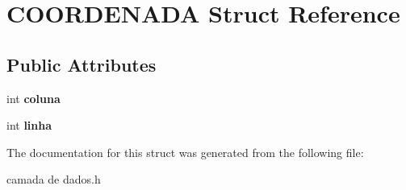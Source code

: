 \hypertarget{structCOORDENADA}{}\section{C\+O\+O\+R\+D\+E\+N\+A\+DA Struct Reference}
\label{structCOORDENADA}
\subsection*{Public Attributes}
\begin{DoxyCompactItemize}
\item 
\mbox{\label{structCOORDENADA_adfbc8d4856ce807139fdf62e00aed29a}} 
int {\bfseries coluna}
\item 
\mbox{\label{structCOORDENADA_aefe14bcc5a066ac3b21500cc3d28c06f}} 
int {\bfseries linha}
\end{DoxyCompactItemize}


The documentation for this struct was generated from the following file\+:\begin{DoxyCompactItemize}
\item 
camada de dados.\+h\end{DoxyCompactItemize}

